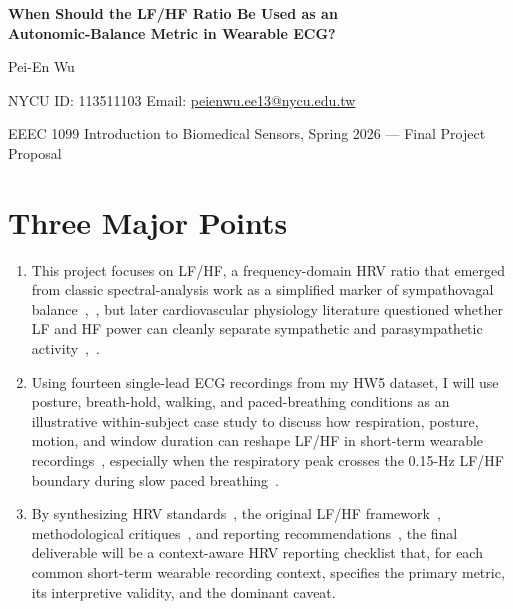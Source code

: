 \documentclass[11pt,a4paper]{article}
\newenvironment{tightenum}{%
  \begin{enumerate}%
    \setlength{\itemsep}{0.4em}%
    \setlength{\parsep}{0pt}%
    \setlength{\topsep}{0.2em}%
    \setlength{\leftmargin}{1.5em}%
}{\end{enumerate}}
\begin{document}
\begin{center}
{\Large\bfseries When Should the LF/HF Ratio Be Used as an\\
Autonomic-Balance Metric in Wearable ECG?\par}
\vspace{0.5em}
Pei-En Wu\\
{\small NYCU ID: 113511103 \quad
Email: \href{mailto:peienwu.ee13@nycu.edu.tw}{peienwu.ee13@nycu.edu.tw}\par}
{\small EEEC 1099 Introduction to Biomedical Sensors, Spring 2026 --- Final Project Proposal}
\end{center}

\vspace{0.5em}

\section*{Three Major Points}

\begin{tightenum}

\item This project focuses on LF/HF, a frequency-domain HRV ratio that
emerged from classic spectral-analysis work as a simplified marker of
sympathovagal balance~\cite{taskforce1996},~\cite{malliani1991}, but later
cardiovascular physiology literature questioned whether LF and HF power can
cleanly separate sympathetic and parasympathetic
activity~\cite{eckberg1997},~\cite{billman2013}.

\item Using fourteen single-lead ECG recordings from my HW5 dataset, I will
use posture, breath-hold, walking, and paced-breathing conditions as an
illustrative within-subject case study to discuss how respiration, posture,
motion, and window duration can reshape LF/HF in short-term wearable
recordings~\cite{bernardi2000}, especially when the respiratory peak crosses
the 0.15-Hz LF/HF boundary during slow paced breathing~\cite{billman2013}.

\item By synthesizing HRV standards~\cite{taskforce1996}, the original LF/HF
framework~\cite{malliani1991}, methodological
critiques~\cite{eckberg1997,bernardi2000,billman2013}, and reporting
recommendations~\cite{laborde2017}, the final deliverable will be a
context-aware HRV reporting checklist that, for each common short-term wearable
recording context, specifies the primary metric, its interpretive validity, and
the dominant caveat.

\end{tightenum}
\end{document}
